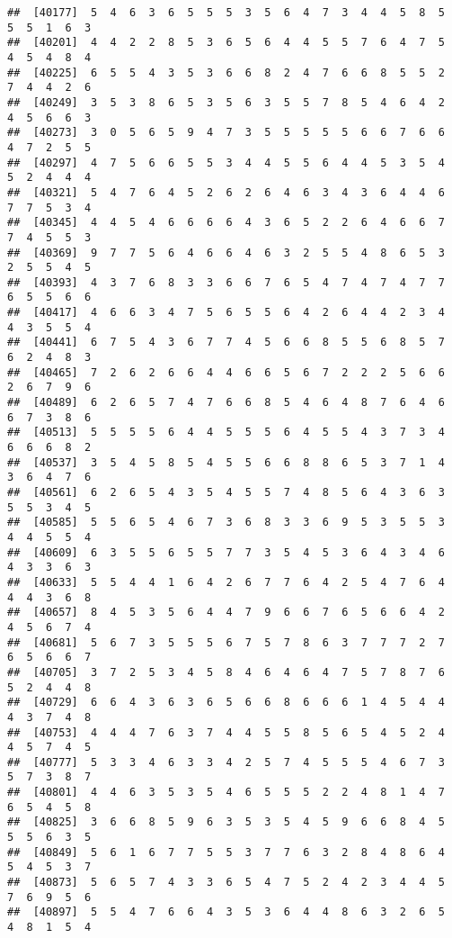 \documentclass[
]{book}
\begin{document}
\begin{verbatim}
##  [40177]  5  4  6  3  6  5  5  5  3  5  6  4  7  3  4  4  5  8  5  5  5  1  6  3
##  [40201]  4  4  2  2  8  5  3  6  5  6  4  4  5  5  7  6  4  7  5  4  5  4  8  4
##  [40225]  6  5  5  4  3  5  3  6  6  8  2  4  7  6  6  8  5  5  2  7  4  4  2  6
##  [40249]  3  5  3  8  6  5  3  5  6  3  5  5  7  8  5  4  6  4  2  4  5  6  6  3
##  [40273]  3  0  5  6  5  9  4  7  3  5  5  5  5  5  6  6  7  6  6  4  7  2  5  5
##  [40297]  4  7  5  6  6  5  5  3  4  4  5  5  6  4  4  5  3  5  4  5  2  4  4  4
##  [40321]  5  4  7  6  4  5  2  6  2  6  4  6  3  4  3  6  4  4  6  7  7  5  3  4
##  [40345]  4  4  5  4  6  6  6  6  4  3  6  5  2  2  6  4  6  6  7  7  4  5  5  3
##  [40369]  9  7  7  5  6  4  6  6  4  6  3  2  5  5  4  8  6  5  3  2  5  5  4  5
##  [40393]  4  3  7  6  8  3  3  6  6  7  6  5  4  7  4  7  4  7  7  6  5  5  6  6
##  [40417]  4  6  6  3  4  7  5  6  5  5  6  4  2  6  4  4  2  3  4  4  3  5  5  4
##  [40441]  6  7  5  4  3  6  7  7  4  5  6  6  8  5  5  6  8  5  7  6  2  4  8  3
##  [40465]  7  2  6  2  6  6  4  4  6  6  5  6  7  2  2  2  5  6  6  2  6  7  9  6
##  [40489]  6  2  6  5  7  4  7  6  6  8  5  4  6  4  8  7  6  4  6  6  7  3  8  6
##  [40513]  5  5  5  5  6  4  4  5  5  5  6  4  5  5  4  3  7  3  4  6  6  6  8  2
##  [40537]  3  5  4  5  8  5  4  5  5  6  6  8  8  6  5  3  7  1  4  3  6  4  7  6
##  [40561]  6  2  6  5  4  3  5  4  5  5  7  4  8  5  6  4  3  6  3  5  5  3  4  5
##  [40585]  5  5  6  5  4  6  7  3  6  8  3  3  6  9  5  3  5  5  3  4  4  5  5  4
##  [40609]  6  3  5  5  6  5  5  7  7  3  5  4  5  3  6  4  3  4  6  4  3  3  6  3
##  [40633]  5  5  4  4  1  6  4  2  6  7  7  6  4  2  5  4  7  6  4  4  4  3  6  8
##  [40657]  8  4  5  3  5  6  4  4  7  9  6  6  7  6  5  6  6  4  2  4  5  6  7  4
##  [40681]  5  6  7  3  5  5  5  6  7  5  7  8  6  3  7  7  7  2  7  6  5  6  6  7
##  [40705]  3  7  2  5  3  4  5  8  4  6  4  6  4  7  5  7  8  7  6  5  2  4  4  8
##  [40729]  6  6  4  3  6  3  6  5  6  6  8  6  6  6  1  4  5  4  4  4  3  7  4  8
##  [40753]  4  4  4  7  6  3  7  4  4  5  5  8  5  6  5  4  5  2  4  4  5  7  4  5
##  [40777]  5  3  3  4  6  3  3  4  2  5  7  4  5  5  5  4  6  7  3  5  7  3  8  7
##  [40801]  4  4  6  3  5  3  5  4  6  5  5  5  2  2  4  8  1  4  7  6  5  4  5  8
##  [40825]  3  6  6  8  5  9  6  3  5  3  5  4  5  9  6  6  8  4  5  5  5  6  3  5
##  [40849]  5  6  1  6  7  7  5  5  3  7  7  6  3  2  8  4  8  6  4  5  4  5  3  7
##  [40873]  5  6  5  7  4  3  3  6  5  4  7  5  2  4  2  3  4  4  5  7  6  9  5  6
##  [40897]  5  5  4  7  6  6  4  3  5  3  6  4  4  8  6  3  2  6  5  4  8  1  5  4

\end{verbatim}
\end{document}
